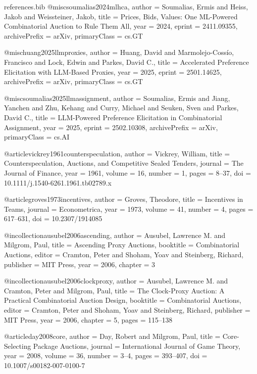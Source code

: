 \begin{filecontents*}{references.bib}
@misc{soumalias2024mlhca,
  author        = {Soumalias, Ermis and Heiss, Jakob and Weissteiner, Jakob},
  title         = {Prices, Bids, Values: One ML-Powered Combinatorial Auction to Rule Them All},
  year          = {2024},
  eprint        = {2411.09355},
  archivePrefix = {arXiv},
  primaryClass  = {cs.GT}
}

@misc{huang2025llmproxies,
  author        = {Huang, David and Marmolejo-Coss{\'i}o, Francisco and Lock, Edwin and Parkes, David C.},
  title         = {Accelerated Preference Elicitation with LLM-Based Proxies},
  year          = {2025},
  eprint        = {2501.14625},
  archivePrefix = {arXiv},
  primaryClass  = {cs.GT}
}

@misc{soumalias2025llmassignment,
  author        = {Soumalias, Ermis and Jiang, Yanchen and Zhu, Kehang and Curry, Michael and Seuken, Sven and Parkes, David C.},
  title         = {LLM-Powered Preference Elicitation in Combinatorial Assignment},
  year          = {2025},
  eprint        = {2502.10308},
  archivePrefix = {arXiv},
  primaryClass  = {cs.AI}
}

@article{vickrey1961counterspeculation,
  author  = {Vickrey, William},
  title   = {Counterspeculation, Auctions, and Competitive Sealed Tenders},
  journal = {The Journal of Finance},
  year    = {1961},
  volume  = {16},
  number  = {1},
  pages   = {8--37},
  doi     = {10.1111/j.1540-6261.1961.tb02789.x}
}

@article{groves1973incentives,
  author  = {Groves, Theodore},
  title   = {Incentives in Teams},
  journal = {Econometrica},
  year    = {1973},
  volume  = {41},
  number  = {4},
  pages   = {617--631},
  doi     = {10.2307/1914085}
}

@incollection{ausubel2006ascending,
  author    = {Ausubel, Lawrence M. and Milgrom, Paul},
  title     = {Ascending Proxy Auctions},
  booktitle = {Combinatorial Auctions},
  editor    = {Cramton, Peter and Shoham, Yoav and Steinberg, Richard},
  publisher = {MIT Press},
  year      = {2006},
  chapter   = {3}
}

@incollection{ausubel2006clockproxy,
  author    = {Ausubel, Lawrence M. and Cramton, Peter and Milgrom, Paul},
  title     = {The Clock-Proxy Auction: A Practical Combinatorial Auction Design},
  booktitle = {Combinatorial Auctions},
  editor    = {Cramton, Peter and Shoham, Yoav and Steinberg, Richard},
  publisher = {MIT Press},
  year      = {2006},
  chapter   = {5},
  pages     = {115--138}
}

@article{day2008core,
  author  = {Day, Robert and Milgrom, Paul},
  title   = {Core-Selecting Package Auctions},
  journal = {International Journal of Game Theory},
  year    = {2008},
  volume  = {36},
  number  = {3--4},
  pages   = {393--407},
  doi     = {10.1007/s00182-007-0100-7}
}


\end{filecontents*}
